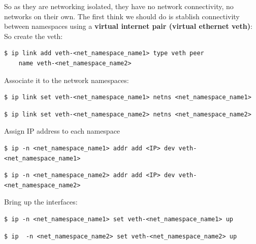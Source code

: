 \documentclass{article}
\newenvironment{codetemplate}[1][]{%
  \mybasecolorbox[#1]
  \itshape
}{%
  \endmybasecolorbox
}
\begin{document}
So as they are networking isolated, they have no network connectivity, no networks on their own. The first think we should do is stablish connectivity between namespaces using a \textbf{virtual internet pair (virtual ethernet veth)}:
So create the veth:
\begin{codetemplate}{}
\begin{verbatim}
$ ip link add veth-<net_namespace_name1> type veth peer 
    name veth-<net_namespace_name2>
\end{verbatim}
\end{codetemplate}

Associate it to the network namespaces:
\begin{codetemplate}{}
\begin{verbatim}
$ ip link set veth-<net_namespace_name1> netns <net_namespace_name1>
\end{verbatim}
\end{codetemplate}
\begin{codetemplate}{}
\begin{verbatim}
$ ip link set veth-<net_namespace_name2> netns <net_namespace_name2>
\end{verbatim}
\end{codetemplate}

Assign IP address to each namespace
\begin{codetemplate}{}
\begin{verbatim}
$ ip -n <net_namespace_name1> addr add <IP> dev veth-<net_namespace_name1>
\end{verbatim}
\end{codetemplate}
\begin{codetemplate}{}
\begin{verbatim}
$ ip -n <net_namespace_name2> addr add <IP> dev veth-<net_namespace_name2>
\end{verbatim}
\end{codetemplate}

Bring up the interfaces:
\begin{codetemplate}{}
\begin{verbatim}
$ ip -n <net_namespace_name1> set veth-<net_namespace_name1> up
\end{verbatim}
\end{codetemplate}
\begin{codetemplate}{}
\begin{verbatim}
$ ip  -n <net_namespace_name2> set veth-<net_namespace_name2> up
\end{verbatim}
\end{codetemplate}
\end{document}
